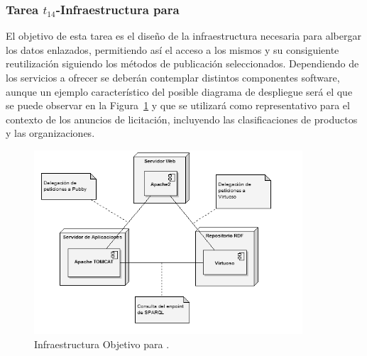 \subsubsection{Tarea $t_{14}$-Infraestructura para \linkeddata}\label{infraestructura-comun}
El objetivo de esta tarea es el diseño de la infraestructura necesaria para albergar los datos enlazados, permitiendo 
así el acceso a los mismos y su consiguiente reutilización siguiendo los métodos de publicación seleccionados. Dependiendo de los servicios a ofrecer se deberán contemplar 
distintos componentes software, aunque un ejemplo característico del posible diagrama de despliegue será el que se puede 
observar en la Figura~\ref{fig:infra-ld} y que se utilizará como representativo para el contexto de los anuncios de licitación, 
incluyendo las clasificaciones de productos y las organizaciones. 

\begin{figure}[!htp]
\centering
	\includegraphics[width=10cm]{images/phd/infra-ld}
	\caption{Infraestructura Objetivo para \linkeddata.}
	\label{fig:infra-ld}
\end{figure}

